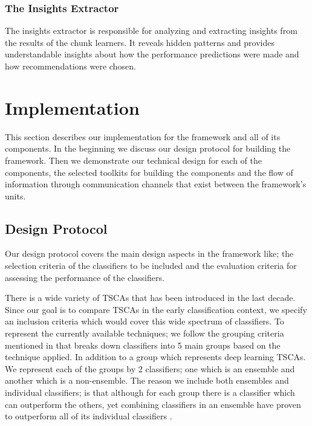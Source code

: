 \subsubsection*{The Insights Extractor}
\label{InsightsExtractor}
The insights extractor is responsible for analyzing and extracting insights from the results of the chunk learners.
It reveals hidden patterns and provides understandable insights about how the performance predictions were made
and how recommendations were chosen.

\section{Implementation}
\label{SectionImplementation}
This section describes our implementation for the framework and all of its components.
In the beginning we discuss our design protocol for building the framework.
Then we demonstrate our technical design for each of the components, the selected toolkits for building the components
and the flow of information through communication channels that exist between the framework's units.

\subsection{Design Protocol}
\label{SubsectionProtocol}
Our design protocol covers the main design aspects in the framework like; the selection criteria of the classifiers to be included
and the evaluation criteria for assessing the performance of the classifiers.

There is a wide variety of TSCAs that has been introduced in the last decade.
Since our goal is to compare TSCAs in the early classification context, we specify an inclusion criteria which would cover this wide spectrum of classifiers.
To represent the currently available techniques; we follow the grouping criteria mentioned in \cite{bagnall2017great} that breaks down classifiers into 5 main groups based on the technique applied.
In addition to a  group which represents deep learning TSCAs. We represent each of the groups by 2 classifiers; one which is an ensemble and another which is a non-ensemble.
The reason we include both ensembles and individual classifiers; is that although for each group there is a classifier which can outperform the others,
yet combining classifiers in an ensemble have proven to outperform all of its individual classifiers \cite{fawaz2019deepreview}.

